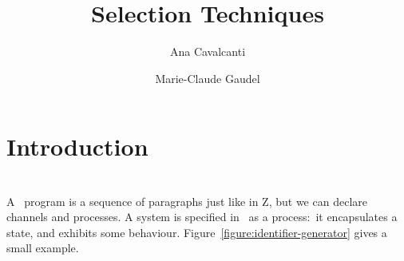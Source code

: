 \documentclass{llncs}
\begin{document}

\title{Selection Techniques}

\author{Ana Cavalcanti \and Marie-Claude Gaudel}

\maketitle


\begin{abstract}

\end{abstract}


\section{Introduction}
\label{section:introduction}



\section{\Circus}
\label{section:circus}

A \Circus\ program is a sequence of paragraphs just like in Z, but we can
declare channels and processes.  A system is specified in \Circus\ as a
process:~it encapsulates a state, and exhibits some behaviour.
Figure~\ref{figure:identifier-generator} gives a small example.
\end{document}
